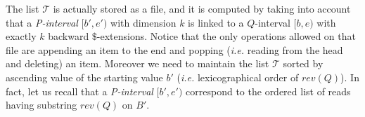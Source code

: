 \documentclass[runningheads,envcountsame,a4paper]{llncs}
\newcommand{\notaestesa}[2]{%
  {\sffamily {\bfseries #1}{\footnotesize #2}}%
  \marginpar{\framebox{\Large *}}%
}
\newcommand{\ie}{\textit{i.e.}\xspace}
\begin{document}







\begin{comment}
More precisely, the steps .... in algorithm \emph{processLinkedInterval}
directly provides the values of the new $\sigma Q$-interval and such
value is appended at the end of the new updated list (or file), in order
to maintain the lexicographic ordering.
In fact, the sorted property of the file, allows to update the files
while reading the files themselves, thus minimizing the operations on the
file.
\notaestesa{Paola}{nota bene il passo dal 3 al 9 non si capisce come sia
implementato in termini di memoria esterna ed interna - io sarei per
descrivere la procedura processLinkedInterval- dettagliandola rispetto
ai linked intervals, che però vanno definiti prima, in termini
costruttivi}.


Intervals $[b,e)$ in $\mathcal{Q}_j$ represent common strings $Q$ of
length $(j+\tau)$.
Their link to the $rev(Q)$-interval $[b',e')$ on $B'$ is easily
maintained (during the backward extension of the intervals of length
$(j+\tau-1)$ to produce the intervals in $Q_j$) by Prop.~\ref{proposition:linked-intervals}.
This list is partioned into $|\Sigma|$ files according to the starting
symbol of $Q$, and maintained sorted by ascending value of the start
$b$.
\end{comment}


The list $\mathcal{T}$ is actually stored as a file, and it is computed by
taking into account that a
\emph{P-interval} $[b', e')$ with dimension $k$ is linked to a
$Q$-interval $[b, e)$ with exactly $k$ backward $\$$-extensions.
Notice that the only operations allowed on that file are appending an item to
the end and popping (\ie reading from the head and deleting) an item.
Moreover we need to maintain the list $\mathcal{T}$ sorted by ascending value of the starting
value $b'$ (\ie lexicographical order of $rev(Q)$).
In fact, let us recall that a \emph{P-interval} $[b', e')$ correspond to
the ordered list of reads having substring $rev(Q)$ on $B'$.
\end{document}
